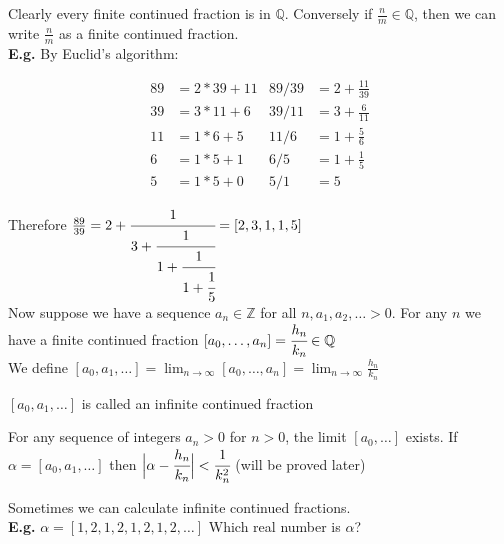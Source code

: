 \documentclass[11pt]{article}
\begin{document}
$ $\\
Clearly every finite continued fraction is in $\mathbb{Q}$. Conversely if $\frac{n}{m} \in \mathbb{Q}$, then we can write $\frac{n}{m}$ as a finite continued fraction.\\[1em]

$ $ \\
\textbf{E.g.} By Euclid's algorithm:

\begin{align*}
	89 &= 2*39+ 11 & 89/39 &= 2 + \frac{11}{39}\\[0.5em]
	39 &= 3*11 + 6 & 39/11 &= 3 + \frac{6}{11}\\[0.5em]
	11 &= 1*6 + 5 & 11/6 &= 1+\frac{5}{6} \\[0.5em]
	6 &= 1*5+1 &  6/5 &= 1 + \frac{1}{5}\\[0.5em]
	5 &= 1*5 + 0 & 5/1 &= 5 
\end{align*}

Therefore $\frac{89}{39} = 2+ \cfrac{1}{3+ \cfrac{1}{1+\cfrac{1}{1+\cfrac{1}{5}}}} = [2,3,1,1,5]$\\[1em]

Now suppose we have a sequence $a_n \in \mathbb{Z}$ for all $n, a_1, a_2, \dots > 0$. For any $n$ we have a finite continued fraction $[a_0, \dots, a_n] = \cfrac{h_n}{k_n} \in \mathbb{Q}$\\[1em]
We define $[a_0, a_1, \dots] = \displaystyle{\lim_{n \to \infty} } [a_0, \dots , a_n] = \displaystyle{\lim_{n \to \infty}} \frac{h_n}{k_n}$



\begin{definition}
	$[a_0, a_1, \dots ]$ is called an infinite continued fraction
\end{definition}


\begin{theorem}
	For any sequence of integers $a_n > 0 $ for $n>0$, the limit $[a_0, \dots] $ exists. If $\alpha = [a_0,a_1,\dots] $ then $\Big| \alpha - \cfrac{h_n}{k_n}\Big| < \cfrac{1}{k_n^2}$ (will be proved later)
\end{theorem}


Sometimes we can calculate infinite continued fractions.\\[1em]

$ $\\
\textbf{E.g.} $\alpha = [1,2,1,2,1,2,1,2,\dots]$ Which real number is $\alpha$?
\end{document}
